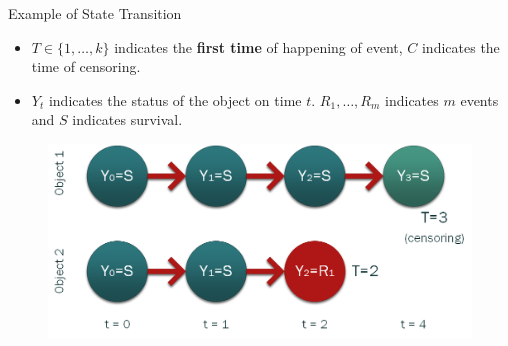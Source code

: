 \documentclass{beamer}
\begin{document}
    \begin{frame}{Example of State Transition}
        \begin{itemize}
            \item $T \in \{1,\dots,k\}$ indicates the {\bf first time} of happening of event, $C$ indicates the time of censoring.
            \item $Y_t$ indicates the status of the object on time $t$. $R_1,\dots,R_m$ indicates $m$ events and $S$ indicates survival.
        \end{itemize}
        
        \begin{figure}
            \centering
            \includegraphics[width=\linewidth]{./two_patient.png}
        \end{figure}
    \end{frame}
    
\end{document}

